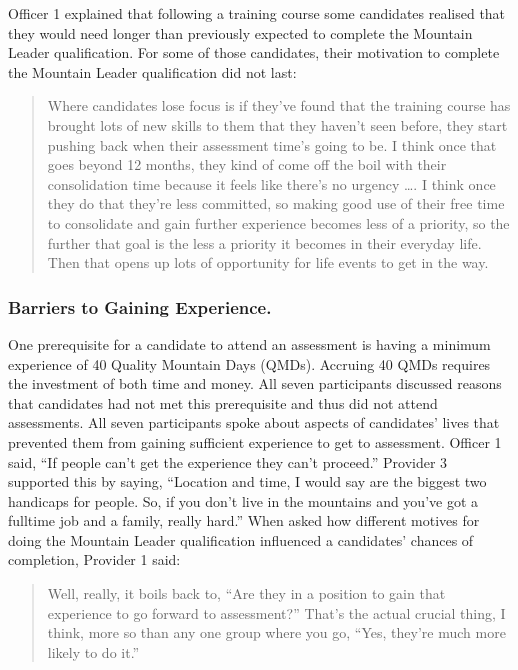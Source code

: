 \documentclass[
  12pt,
  a4paper,
]{book}
\begin{document}
Officer 1 explained that following a training course some candidates realised that they would need longer than previously expected to complete the Mountain Leader qualification. For some of those candidates, their motivation to complete the Mountain Leader qualification did not last:

\begin{quote}
Where candidates lose focus is if they've found that the training course has brought lots of new skills to them that they haven't seen before, they start pushing back when their assessment time's going to be. I think once that goes beyond 12 months, they kind of come off the boil with their consolidation time because it feels like there's no urgency \ldots. I think once they do that they're less committed, so making good use of their free time to consolidate and gain further experience becomes less of a priority, so the further that goal is the less a priority it becomes in their everyday life. Then that opens up lots of opportunity for life events to get in the way.
\end{quote}

\hypertarget{qual-gta-gaining-experience}{%
\subsubsection{Barriers to Gaining Experience.}\label{qual-gta-gaining-experience}}

One prerequisite for a candidate to attend an assessment is having a minimum experience of 40 Quality Mountain Days (QMDs). Accruing 40 QMDs requires the investment of both time and money. All seven participants discussed reasons that candidates had not met this prerequisite and thus did not attend assessments. All seven participants spoke about aspects of candidates' lives that prevented them from gaining sufficient experience to get to assessment. Officer 1 said, ``If people can't get the experience they can't proceed.'' Provider 3 supported this by saying, ``Location and time, I would say are the biggest two handicaps for people. So, if you don't live in the mountains and you've got a fulltime job and a family, really hard.'' When asked how different motives for doing the Mountain Leader qualification influenced a candidates' chances of completion, Provider 1 said:

\begin{quote}
Well, really, it boils back to, ``Are they in a position to gain that experience to go forward to assessment?'' That's the actual crucial thing, I think, more so than any one group where you go, ``Yes, they're much more likely to do it.''
\end{quote}
\end{document}
